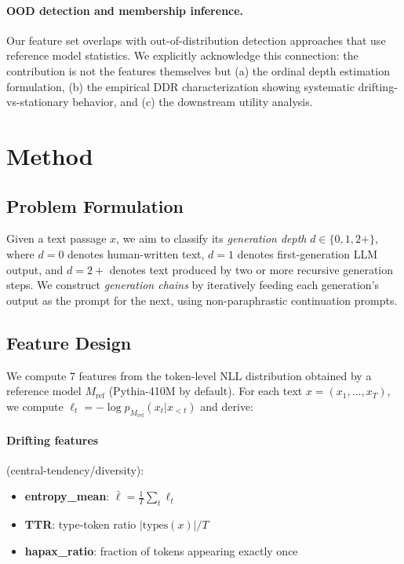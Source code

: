 \documentclass[11pt,a4paper]{article}
\begin{document}
\paragraph{OOD detection and membership inference.}
Our feature set overlaps with out-of-distribution detection approaches that use reference model statistics.
We explicitly acknowledge this connection: the contribution is not the features themselves but (a) the ordinal depth estimation formulation, (b) the empirical DDR characterization showing systematic drifting-vs-stationary behavior, and (c) the downstream utility analysis.

\section{Method}

\subsection{Problem Formulation}
Given a text passage $x$, we aim to classify its \emph{generation depth} $d \in \{0, 1, 2+\}$, where $d=0$ denotes human-written text, $d=1$ denotes first-generation LLM output, and $d=2+$ denotes text produced by two or more recursive generation steps.
We construct \emph{generation chains} by iteratively feeding each generation's output as the prompt for the next, using non-paraphrastic continuation prompts.

\subsection{Feature Design}
We compute 7 features from the token-level NLL distribution obtained by a reference model $M_\text{ref}$ (Pythia-410M by default).
For each text $x = (x_1, \ldots, x_T)$, we compute $\ell_t = -\log p_{M_\text{ref}}(x_t | x_{<t})$ and derive:

\paragraph{Drifting features} (central-tendency/diversity):
\begin{itemize}
    \item \textbf{entropy\_mean}: $\bar{\ell} = \frac{1}{T}\sum_t \ell_t$
    \item \textbf{TTR}: type-token ratio $|\text{types}(x)| / T$
    \item \textbf{hapax\_ratio}: fraction of tokens appearing exactly once
\end{itemize}
\end{document}
